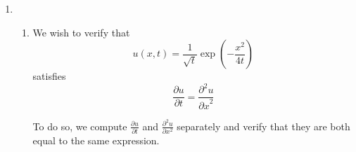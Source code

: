 \documentclass[letterpaper,11pt]{article}
\DeclareMathOperator{\D}{D}
\newcommand{\parens}[1]{\left(#1\right)}
\begin{document}
\begin{enumerate}
\begin{proof}
            Notice that $f^{m+1} = f f^m$.
            By the Power Rule, $f^{m+1}$ is differentiable because $f$ is
            differentiable by assumption and $f^m$ is differentiable due to the
            Induction Hypothesis.
            Then,
            \begin{equation*}
                \D{(f f^m)} = f \D{(f^m)} + f^m \D{f}
            \end{equation*}
            but we can further expand $\D{(f^m)}$ by the Induction Hypothesis
            to obtain the result
            \begin{align*}
                f \D{(f^m)} + f^m \D{f}
                &= f m f^{m-1} \D{f} + f^m \D{f} \\
                &= m f^m \D{f} + f^m \D{f} \\
                &= (m + 1) f^m \D{f}
            \end{align*}
            as required.
        \end{proof}

    \item
        \begin{enumerate}
            \item
                We wish to verify that
                \begin{equation*}
                    u(x, t) = \frac{1}{\sqrt{t}} \exp\parens{-\frac{x^2}{4t}}
                \end{equation*}
                satisfies
                \begin{equation*}
                    \frac{\partial u}{\partial t}
                    =
                    \frac{\partial^2 u}{{\partial x}^2}
                \end{equation*}

                To do so, we compute $\frac{\partial u}{\partial t}$ and
                $\frac{\partial^2 u}{\partial x^2}$ separately and verify that
                they are both equal to the same expression.


\end{enumerate}
\end{enumerate}
\end{document}
